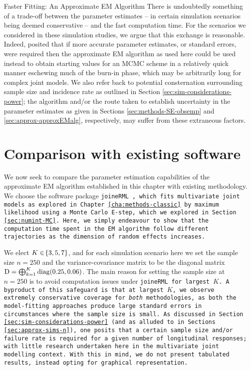 \begin{chapter}{\label{cha:approx}Faster Fitting: An Approximate EM Algorithm}
  There is undoubtedly something of a trade-off between the parameter estimates -- in certain simulation scenarios being deemed conservative -- and the fast computation time. For the scenarios we considered in these simulation studies, we argue that this exchange is reasonable. Indeed, \citet{Bernhardt15} posited that if more accurate parameter estimates, or standard errors, were required then the approximate EM algorithm as used here could be used instead to obtain starting values for \eg an MCMC scheme in a relatively quick manner \ie eschewing much of the burn-in phase, which may be arbitrarily long for complex joint models. We also refer back to potential consternation surrounding sample size and incidence rate as outlined in Section \ref{sec:sim-considerations-power}; the algorithm and/or the route taken to establish uncertainty in the parameter estimates as given in Sections \ref{sec:methods-SE-obsemp} and \ref{sec:approx-approxEMalg}, respectively, may suffer from these extraneous factors.
  
  \section{Comparison with existing software}\label{sec:approx-comparisons}
  We now seek to compare the parameter estimation capabilities of the approximate EM algorithm established in this chapter with existing methodology. We choose the software package \tt{joineRML} \citep{Hickey2018}, which fits multivariate joint models as explored in Chapter \ref{cha:methods-classic} by maximum likelihood using a Monte Carlo E-step, which we explored in Section \ref{sec:numint-MC}. Here, we simply endeavour to show that the computation time spent in the EM algorithm follow different trajectories as the dimension of random effects increases.

  We elect $K\in\!\left\{3,5,7\right\}$, and for each simulation scenario here we set the sample size $n=250$ and the variance-covariance matrix to be the diagonal matrix $\mathrm{D}=\bigoplus_{k=1}^K \mathrm{diag}\!\left(0.25, 0.06\right)$. The main reason for setting the sample size at $n=250$ is to avoid computation issues under \tt{joineRML} for largest $K$. A byproduct of this safeguard is that at largest $K$, we observe extremely conservative coverage for \textit{both} methodologies, as both the model-fitting approaches produce large standard errors in circumstances where the sample size is small. As discussed in Section \ref{sec:sim-considerations-power} (and as alluded to in Sections \ref{sec:approx-sims-n}), one posits that a certain sample size and/or failure rate is required for a given number of longitudinal responses; with little research undertaken here in the multivariate joint modelling context. With this in mind, we do not present tabulated results, instead opting for graphical representation.


\end{chapter}
